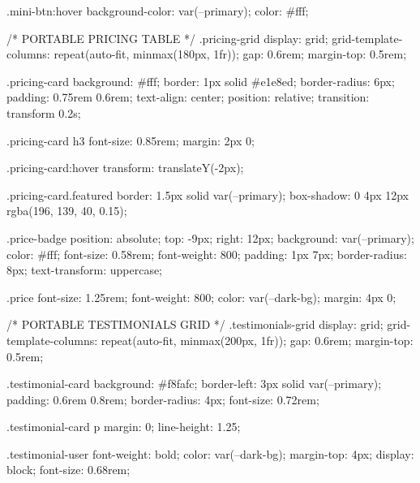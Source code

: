         .mini-btn:hover {
            background-color: var(--primary);
            color: #fff;
        }

        /* PORTABLE PRICING TABLE */
        .pricing-grid {
            display: grid;
            grid-template-columns: repeat(auto-fit, minmax(180px, 1fr));
            gap: 0.6rem;
            margin-top: 0.5rem;
        }

        .pricing-card {
            background: #fff;
            border: 1px solid #e1e8ed;
            border-radius: 6px;
            padding: 0.75rem 0.6rem;
            text-align: center;
            position: relative;
            transition: transform 0.2s;
        }

        .pricing-card h3 {
            font-size: 0.85rem;
            margin: 2px 0;
        }

        .pricing-card:hover {
            transform: translateY(-2px);
        }

        .pricing-card.featured {
            border: 1.5px solid var(--primary);
            box-shadow: 0 4px 12px rgba(196, 139, 40, 0.15);
        }

        .price-badge {
            position: absolute;
            top: -9px;
            right: 12px;
            background: var(--primary);
            color: #fff;
            font-size: 0.58rem;
            font-weight: 800;
            padding: 1px 7px;
            border-radius: 8px;
            text-transform: uppercase;
        }

        .price {
            font-size: 1.25rem;
            font-weight: 800;
            color: var(--dark-bg);
            margin: 4px 0;
        }

        /* PORTABLE TESTIMONIALS GRID */
        .testimonials-grid {
            display: grid;
            grid-template-columns: repeat(auto-fit, minmax(200px, 1fr));
            gap: 0.6rem;
            margin-top: 0.5rem;
        }

        .testimonial-card {
            background: #f8fafc;
            border-left: 3px solid var(--primary);
            padding: 0.6rem 0.8rem;
            border-radius: 4px;
            font-size: 0.72rem;
        }

        .testimonial-card p {
            margin: 0;
            line-height: 1.25;
        }

        .testimonial-user {
            font-weight: bold;
            color: var(--dark-bg);
            margin-top: 4px;
            display: block;
            font-size: 0.68rem;
        }

